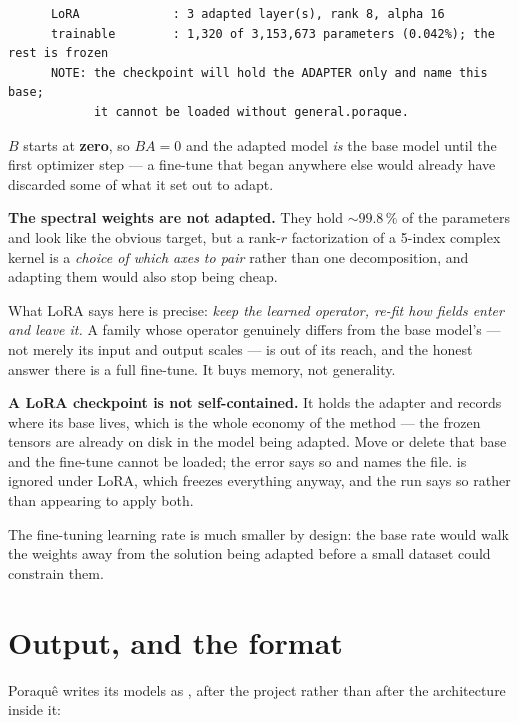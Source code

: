 \begin{lstlisting}
      LoRA             : 3 adapted layer(s), rank 8, alpha 16
      trainable        : 1,320 of 3,153,673 parameters (0.042%); the rest is frozen
      NOTE: the checkpoint will hold the ADAPTER only and name this base;
            it cannot be loaded without general.poraque.
\end{lstlisting}

$B$ starts at \textbf{zero}, so $BA = 0$ and the adapted model \emph{is} the
base model until the first optimizer step --- a fine-tune that began anywhere
else would already have discarded some of what it set out to adapt.

\begin{pwarn}
\textbf{The spectral weights are not adapted.} They hold ${\sim}99.8\,\%$ of
the parameters and look like the obvious target, but a rank-$r$ factorization
of a 5-index complex kernel is a \emph{choice of which axes to pair} rather
than one decomposition, and adapting them would also stop being cheap.

What LoRA says here is precise: \emph{keep the learned operator, re-fit how
fields enter and leave it.} A family whose operator genuinely differs from the
base model's --- not merely its input and output scales --- is out of its
reach, and the honest answer there is a full fine-tune. It buys memory, not
generality.
\end{pwarn}

\begin{pnote}
\textbf{A LoRA checkpoint is not self-contained.} It holds the adapter and
records where its base lives, which is the whole economy of the method --- the
frozen tensors are already on disk in the model being adapted. Move or delete
that base and the fine-tune cannot be loaded; the error says so and names the
file.  is ignored under LoRA, which freezes
everything anyway, and the run says so rather than appearing to apply both.
\end{pnote}

The fine-tuning learning rate is much smaller by design: the base rate would
walk the weights away from the solution being adapted before a small dataset
could constrain them.

\section{Output, and the  format}
\label{sec:poraque}

Poraqu\^e writes its models as , after the project rather than
after the architecture inside it:

